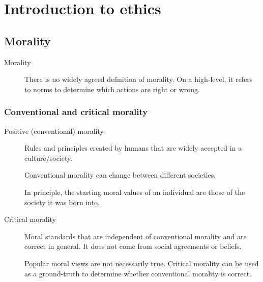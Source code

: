 \chapter{Introduction to ethics}



\section{Morality}

\begin{description}
    \item[Morality] 
        There is no widely agreed definition of morality. On a high-level, it refers to norms to determine which actions are right or wrong.  
\end{description}


\subsection{Conventional and critical morality}

\begin{description}
    \item[Positive (conventional) morality] 
        Rules and principles created by humans that are widely accepted in a culture/society.

        \begin{remark}
            Conventional morality can change between different societies.
        \end{remark}
        
        \begin{remark}
            In principle, the starting moral values of an individual are those of the society it was born into.
        \end{remark}

    \item[Critical morality] 
        Moral standards that are independent of conventional morality and are correct in general. It does not come from social agreements or beliefs.

        \begin{remark}
            Popular moral views are not necessarily true. Critical morality can be used as a ground-truth to determine whether conventional morality is correct.
        \end{remark}
\end{description}


